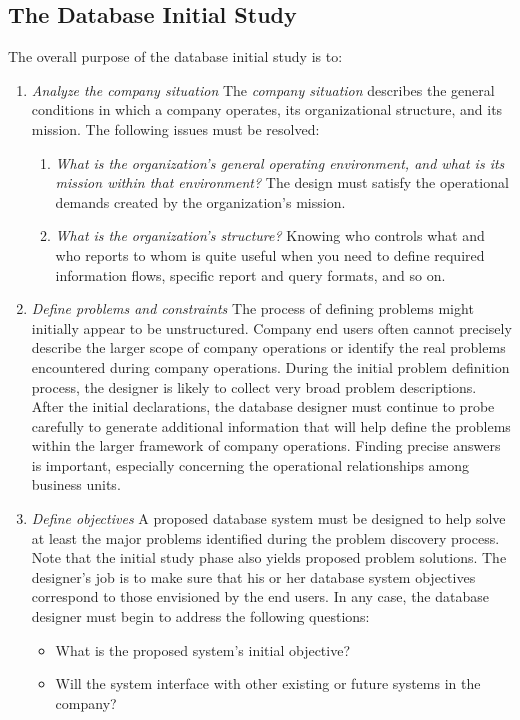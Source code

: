 \documentclass[a4paper, 12pt, titlepage]{report}
\begin{document}
\subsection{The Database Initial Study}
The overall purpose of the database initial study is to:
\begin{enumerate}
\item \emph{Analyze the company situation}
The \emph{company situation} describes the general conditions in which a company operates, its organizational structure, and its mission. The following issues must be resolved:
\begin{enumerate}
\item \emph{What is the organization’s general operating environment, and what is its mission within that environment?} The design must satisfy the operational demands created by the organization’s mission.
\item \emph{What is the organization’s structure?} Knowing who controls what and who reports to whom is quite useful when you need to define required information flows, specific report and query formats, and so on.
\end{enumerate}
\item \emph{Define problems and constraints}
The process of defining problems might initially appear to be unstructured. Company end users often cannot precisely describe the larger scope of company operations or identify the real problems encountered during company operations. During the initial problem definition process, the designer is likely to collect very broad problem descriptions. After the initial declarations, the database designer must continue to probe carefully to generate additional information that will help define the problems within the larger framework of company operations. Finding precise answers is important, especially concerning the operational relationships among business units.
\item \emph{Define objectives}
A proposed database system must be designed to help solve at least the major problems identified during the problem discovery process. Note that the initial study phase also yields proposed problem solutions. The designer’s job is to make sure that his or her database system objectives correspond to those envisioned by the end users. In any case, the database designer must begin to address the following questions:
\begin{itemize}
\item What is the proposed system’s initial objective?
\item Will the system interface with other existing or future systems in the company?

\end{itemize}
\end{enumerate}
\end{document}

